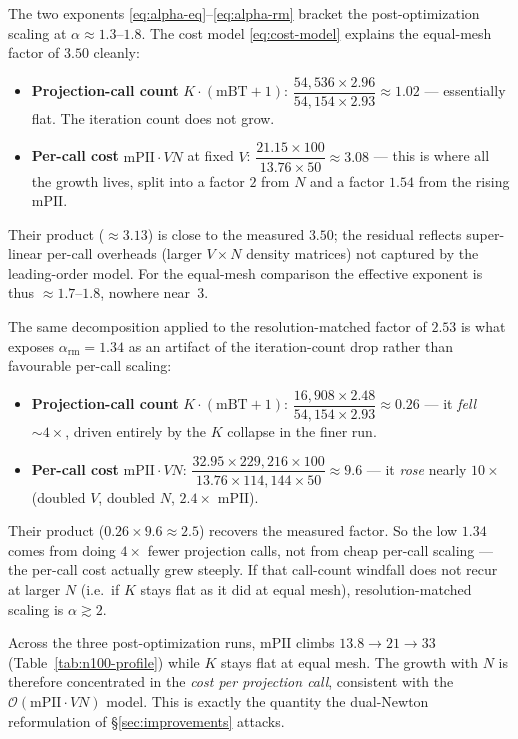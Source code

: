 \documentclass[11pt,a4paper]{article}
\begin{document}
The two exponents \eqref{eq:alpha-eq}--\eqref{eq:alpha-rm} bracket the
post-optimization scaling at $\alpha\approx1.3$--$1.8$.  The cost model
\eqref{eq:cost-model} explains the equal-mesh factor of $3.50$ cleanly:
\begin{itemize}
  \item \textbf{Projection-call count} $K\cdot(\mathrm{mBT}+1)$:
    $\dfrac{54{,}536\times2.96}{54{,}154\times2.93}\approx1.02$ --- essentially
    flat.  The iteration count does not grow.
  \item \textbf{Per-call cost} $\mathrm{mPII}\cdot VN$ at fixed $V$:
    $\dfrac{21.15\times100}{13.76\times50}\approx3.08$ --- this is where all the
    growth lives, split into a factor $2$ from $N$ and a factor $1.54$ from the
    rising $\mathrm{mPII}$.
\end{itemize}
Their product ($\approx3.13$) is close to the measured $3.50$; the residual
reflects super-linear per-call overheads (larger $V\times N$ density matrices)
not captured by the leading-order model.  For the equal-mesh comparison the
effective exponent is thus $\approx1.7$--$1.8$, nowhere near~$3$.

The same decomposition applied to the resolution-matched factor of $2.53$ is
what exposes $\alpha_{\text{rm}}=1.34$ as an artifact of the iteration-count
drop rather than favourable per-call scaling:
\begin{itemize}
  \item \textbf{Projection-call count} $K\cdot(\mathrm{mBT}+1)$:
    $\dfrac{16{,}908\times2.48}{54{,}154\times2.93}\approx0.26$ --- it
    \emph{fell} $\sim\!4\times$, driven entirely by the $K$ collapse in the
    finer run.
  \item \textbf{Per-call cost} $\mathrm{mPII}\cdot VN$:
    $\dfrac{32.95\times229{,}216\times100}{13.76\times114{,}144\times50}
    \approx9.6$ --- it \emph{rose} nearly $10\times$ (doubled $V$, doubled $N$,
    $2.4\times$ $\mathrm{mPII}$).
\end{itemize}
Their product ($0.26\times9.6\approx2.5$) recovers the measured factor.  So the
low $1.34$ comes from doing $4\times$ fewer projection calls, not from cheap
per-call scaling --- the per-call cost actually grew steeply.  If that
call-count windfall does not recur at larger $N$ (i.e.\ if $K$ stays flat as it
did at equal mesh), resolution-matched scaling is $\alpha\gtrsim2$.

\begin{remark}
Across the three post-optimization runs, $\mathrm{mPII}$ climbs
$13.8\to21\to33$ (Table~\ref{tab:n100-profile}) while $K$ stays flat at equal
mesh.  The growth with $N$ is therefore concentrated in the \emph{cost per
projection call}, consistent with the $\mathcal{O}(\mathrm{mPII}\cdot VN)$
model.  This is exactly the quantity the dual-Newton reformulation of
\S\ref{sec:improvements} attacks.
\end{remark}
\end{document}
